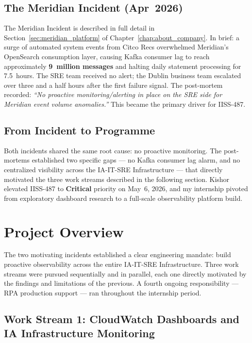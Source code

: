 \subsection{The Meridian Incident (Apr~2026)}

The Meridian Incident is described in full detail in
Section~\ref{sec:meridian_platform} of Chapter~\ref{chap:about_company}.
In brief: a surge of automated system events from Citco Recs overwhelmed
Meridian's OpenSearch consumption layer, causing Kafka consumer lag to
reach approximately \textbf{9~million messages} and halting daily
statement processing for 7.5~hours. The SRE team received no alert; the
Dublin business team escalated over three and a half hours after the
first failure signal. The post-mortem recorded: \textit{``No proactive
monitoring/alerting in place on the SRE side for Meridian event volume
anomalies.''} This became the primary driver for IISS-487.

\subsection{From Incident to Programme}

Both incidents shared the same root cause: no proactive monitoring. The
post-mortems established two specific gaps --- no Kafka consumer lag alarm,
and no centralized visibility across the IA-IT-SRE Infrastructure --- that
directly motivated the three work streams described in the following
section. Kishor elevated IISS-487 to \textbf{Critical} priority on
May~6, 2026, and my internship pivoted from exploratory dashboard research
to a full-scale observability platform build.

\section{Project Overview}
\label{sec:project_overview}

The two motivating incidents established a clear engineering mandate: build
proactive observability across the entire IA-IT-SRE Infrastructure. Three
work streams were pursued sequentially and in parallel, each one directly
motivated by the findings and limitations of the previous. A fourth
ongoing responsibility --- RPA production support --- ran throughout the
internship period.

\subsection{Work Stream 1: CloudWatch Dashboards and IA Infrastructure Monitoring}

